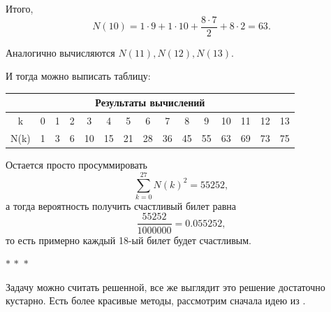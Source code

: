 \documentclass[a4paper,12pt]{article}
\newcommand{\threestars}{\begin{center}$ {\ast}\,{\ast}\,{\ast} $\end{center}}
\newcounter{th-counter}
\newcounter{col-counter}
\begin{document}
Итого,
\[
N(10) = 1 \cdot 9 + 1 \cdot 10 + \frac{8 \cdot 7}{2} + 8 \cdot 2 = 63.
\]

Аналогично вычисляются $N(11), N(12), N(13)$.

И тогда можно выписать таблицу:\\

\begin{center}
    \begin{tabular}{|*{15}{c|}} %
    \hline
    \multicolumn{15}{|c|}{\textbf{Результаты вычислений}} \\
    \hline
    k & 0 & 1 & 2 & 3 & 4 & 5 & 6 & 7 & 8 & 9 & 10 &
    11 & 12 & 13 \\
    \hline
    N(k) & 1 & 3 & 6 & 10 & 15 & 21 & 28 & 36 & 45 &
    55 & 63 & 69 & 73 & 75\\
    \hline
    \end{tabular}
\end{center}

Остается просто просуммировать
\[
\sum_{k=0}^{27} N(k)^2 = 55252,
\]
а тогда вероятность получить счастливый билет равна
\[
\frac{55252}{1000000} = 0.055252,
\]
то есть примерно каждый 18-ый билет будет счастливым.

\threestars

Задачу можно считать решенной, все же выглядит это решение достаточно кустарно. Есть более красивые методы, рассмотрим сначала идею из \cite{OneMoreTimeAboutHappyTickets}.



\newpage
\nocite{*}
\printbibliography[nottype=unpublished]
\end{document}
